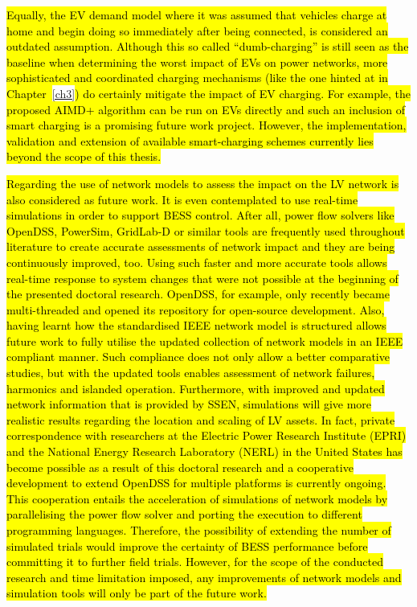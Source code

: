 \hl{Equally, the EV demand model where it was assumed that vehicles charge at home and begin doing so immediately after being connected, is considered an outdated assumption.
Although this so called ``dumb-charging'' is still seen as the baseline when determining the worst impact of EVs on power networks, more sophisticated and coordinated charging mechanisms (like the one hinted at in Chapter~}\ref{ch3}\hl{) do certainly mitigate the impact of EV charging.
For example, the proposed AIMD+ algorithm can be run on EVs directly and such an inclusion of smart charging is a promising future work project.
However, the implementation, validation and extension of available smart-charging schemes currently lies beyond the scope of this thesis.}

\hl{Regarding the use of network models to assess the impact on the LV network is also considered as future work.
It is even contemplated to use real-time simulations in order to support BESS control.
After all, power flow solvers like OpenDSS, PowerSim, GridLab-D or similar tools are frequently used throughout literature to create accurate assessments of network impact and they are being continuously improved, too.
Using such faster and more accurate tools allows real-time response to system changes that were not possible at the beginning of the presented doctoral research.
OpenDSS, for example, only recently became multi-threaded and opened its repository for open-source development.
Also, having learnt how the standardised IEEE network model is structured allows future work to fully utilise the updated collection of network models in an IEEE compliant manner.
Such compliance does not only allow a better comparative studies, but with the updated tools enables assessment of network failures, harmonics and islanded operation.
Furthermore, with improved and updated network information that is provided by SSEN, simulations will give more realistic results regarding the location and scaling of LV assets.
In fact, private correspondence with researchers at the Electric Power Research Institute (EPRI) and the National Energy Research Laboratory (NERL) in the United States has become possible as a result of this doctoral research and a cooperative development to extend OpenDSS for multiple platforms is currently ongoing.
This cooperation entails the acceleration of simulations of network models by parallelising the power flow solver and porting the execution to different programming languages.
Therefore, the possibility of extending the number of simulated trials would improve the certainty of BESS performance before committing it to further field trials.
However, for the scope of the conducted research and time limitation imposed, any improvements of network models and simulation tools will only be part of the future work.}

